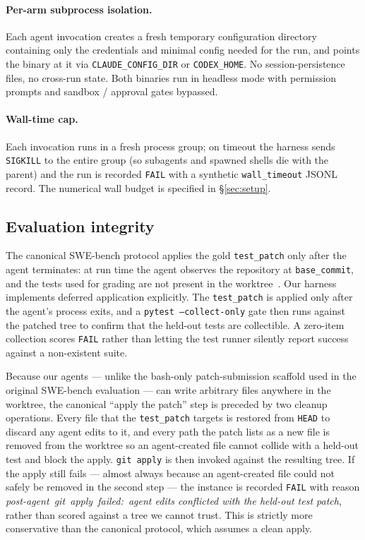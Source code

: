 \paragraph{Per-arm subprocess isolation.} Each agent invocation
creates a fresh temporary configuration directory containing only the
credentials and minimal config needed for the run, and points the
binary at it via \texttt{CLAUDE\allowbreak\_CONFIG\allowbreak\_DIR} or
\texttt{CODEX\_HOME}. No session-persistence files, no cross-run
state. Both binaries run in headless mode with permission prompts and
sandbox / approval gates bypassed.

\paragraph{Wall-time cap.} Each invocation runs in a fresh process
group; on timeout the harness sends \texttt{SIGKILL} to the entire
group (so subagents and spawned shells die with the parent) and the
run is recorded \texttt{FAIL} with a synthetic \texttt{wall\_timeout}
JSONL record. The numerical wall budget is specified in
§\ref{sec:setup}.

\subsection{Evaluation integrity}
\label{sec:method-integrity}
\label{sec:m-integrity}

The canonical SWE-bench protocol applies the gold \texttt{test\_patch}
only after the agent terminates: at run time the agent observes the
repository at \texttt{base\_commit}, and the tests used for grading
are not present in the worktree~\cite{jimenez2024swebench}. Our
harness implements deferred application explicitly. The
\texttt{test\_patch} is applied only after the agent's process exits,
and a \texttt{pytest~--collect-only} gate then runs against the
patched tree to confirm that the held-out tests are collectible. A
zero-item collection scores \texttt{FAIL} rather than letting the test
runner silently report success against a non-existent suite.

Because our agents --- unlike the bash-only patch-submission scaffold
used in the original SWE-bench evaluation --- can write arbitrary
files anywhere in the worktree, the canonical ``apply the patch''
step is preceded by two cleanup operations. Every file that the
\texttt{test\_patch} targets is restored from \texttt{HEAD} to discard
any agent edits to it, and every path the patch lists as a new file
is removed from the worktree so an agent-created file cannot collide
with a held-out test and block the apply. \texttt{git~apply} is then
invoked against the resulting tree. If the apply still fails ---
almost always because an agent-created file could not safely be
removed in the second step --- the instance is recorded
\texttt{FAIL} with reason \emph{post-agent~git~apply~failed:~agent
edits conflicted with the held-out test patch}, rather than scored
against a tree we cannot trust. This is strictly more conservative
than the canonical protocol, which assumes a clean apply.

